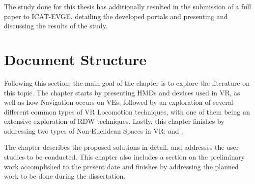 The study done for this thesis has additionally resulted in the submission of a full paper to ICAT-EVGE, detailing the developed portals 
and presenting and discussing the results of the study.

\section{Document Structure}
\label{sec:doc-struct}


Following this section, the main goal of the  chapter is to explore the literature on this topic. The chapter starts by presenting
\glspl{HMD} and devices used in \gls{VR}, as well as how Navigation occurs on \glspl{VE}, followed by an exploration of several different 
common types of \gls{VR} Locomotion techniques, with one of them being an extensive exploration of \gls{RDW} techniques. Lastly, this chapter 
finishes by addressing two types of Non-Euclidean Spaces in \gls{VR}:  and . 

The  chapter describes the proposed solutions in detail, and addresses the user studies to be conducted. 
This chapter also includes a section on the preliminary work accomplished to the present date and finishes by addressing the planned work to 
be done during the dissertation.
